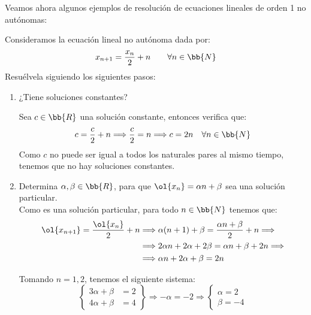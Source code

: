 Veamos ahora algunos ejemplos de resolución de ecuaciones lineales de orden 1 no autónomas:
\begin{ejercicio*}
    Consideramos la ecuación lineal no autónoma dada por:
    \begin{equation*}
        x_{n+1} = \frac{x_n}{2} + n\qquad \forall n \in \bb{N}
    \end{equation*}
    Resuélvela siguiendo los siguientes pasos:
    \begin{enumerate}
        \item ¿Tiene soluciones constantes?

        Sea $c\in\bb{R}$ una solución constante, entonces verifica que:
        \begin{equation*}
            c = \dfrac{c}{2}+n \Longrightarrow \dfrac{c}{2} = n \Longrightarrow c = 2n \quad \forall n \in \bb{N}
        \end{equation*}
        Como $c$ no puede ser igual a todos los naturales pares al mismo tiempo, tenemos que no hay soluciones constantes.
        
        \item Determina $\alpha,\beta\in \bb{R}$, para que $\ol{x_n}=\alpha n+\beta$ sea una solución particular.\\

        Como es una solución particular, para todo $n\in \bb{N}$ tenemos que:
        \begin{align*}
            \ol{x_{n+1}} = \frac{\ol{x_n}}{2} + n & \Longrightarrow 
            \alpha(n+1) + \beta = \frac{\alpha n + \beta}{2} + n \Longrightarrow \\&\Longrightarrow
            2\alpha n +2\alpha + 2\beta = \alpha n +\beta + 2n
            \Longrightarrow \\&\Longrightarrow
            \alpha n +2\alpha +\beta = 2n
        \end{align*}

        Tomando $n=1,2$, tenemos el siguiente sistema:
        \begin{equation*}
            \left\{\begin{array}{ll}
                3\alpha + \beta &= 2\\
                4\alpha + \beta &= 4
            \end{array}\right\}
            \Longrightarrow
            -\alpha = -2 \Longrightarrow
            \left\{\begin{array}{l}
                \alpha = 2\\
                \beta = -4
            \end{array}\right.
        \end{equation*}


\end{enumerate}
\end{ejercicio*}
